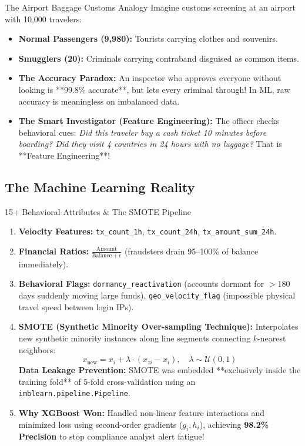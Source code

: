 \documentclass[11pt,a4paper]{article}
\begin{document}
\begin{analogybox}{The Airport Baggage Customs Analogy}
Imagine customs screening at an airport with 10,000 travelers:
\begin{itemize}
    \item \textbf{Normal Passengers (9,980):} Tourists carrying clothes and souvenirs.
    \item \textbf{Smugglers (20):} Criminals carrying contraband disguised as common items.
    \item \textbf{The Accuracy Paradox:} An inspector who approves everyone without looking is **99.8\% accurate**, but lets every criminal through! In ML, raw accuracy is meaningless on imbalanced data.
    \item \textbf{The Smart Investigator (Feature Engineering):} The officer checks behavioral cues: \textit{Did this traveler buy a cash ticket 10 minutes before boarding? Did they visit 4 countries in 24 hours with no luggage?} That is **Feature Engineering**!
\end{itemize}
\end{analogybox}

\subsection{The Machine Learning Reality}

\begin{techbox}{15+ Behavioral Attributes \& The SMOTE Pipeline}
\begin{enumerate}
    \item \textbf{Velocity Features:} \texttt{tx\_count\_1h}, \texttt{tx\_count\_24h}, \texttt{tx\_amount\_sum\_24h}.
    \item \textbf{Financial Ratios:} $\frac{\text{Amount}}{\text{Balance} + \epsilon}$ (fraudsters drain 95--100\% of balance immediately).
    \item \textbf{Behavioral Flags:} \texttt{dormancy\_reactivation} (accounts dormant for $>180$ days suddenly moving large funds), \texttt{geo\_velocity\_flag} (impossible physical travel speed between login IPs).
    \item \textbf{SMOTE (Synthetic Minority Over-sampling Technique):}
    Interpolates new synthetic minority instances along line segments connecting $k$-nearest neighbors:
    $$x_{\text{new}} = x_i + \lambda \cdot (x_{zi} - x_i), \quad \lambda \sim \mathcal{U}(0, 1)$$
    \textbf{Data Leakage Prevention:} SMOTE was embedded **exclusively inside the training fold** of 5-fold cross-validation using an \texttt{imblearn.pipeline.Pipeline}.
    \item \textbf{Why XGBoost Won:} Handled non-linear feature interactions and minimized loss using second-order gradients ($g_i, h_i$), achieving \textbf{98.2\% Precision} to stop compliance analyst alert fatigue!
\end{enumerate}
\end{techbox}
\end{document}
